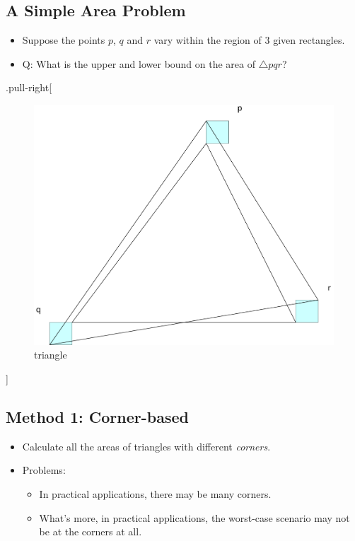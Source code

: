 \documentclass[
]{article}
\providecommand{\tightlist}{%
  \setlength{\itemsep}{0pt}\setlength{\parskip}{0pt}}
\begin{document}
\hypertarget{a-simple-area-problem}{%
\subsection{A Simple Area Problem}\label{a-simple-area-problem}}

\begin{itemize}
\tightlist
\item
  Suppose the points \(p\), \(q\) and \(r\) vary within the region of 3 given rectangles.
\item
  Q: What is the upper and lower bound on the area of \(\triangle pqr\)?
\end{itemize}

.pull-right{[}

\begin{figure}
\centering
\includegraphics{lec04.files/triangle.svg}
\caption{triangle}
\end{figure}

{]}

\hypertarget{method-1-corner-based}{%
\subsection{Method 1: Corner-based}\label{method-1-corner-based}}

\begin{itemize}
\tightlist
\item
  Calculate all the areas of triangles with different \emph{corners}.
\item
  Problems:

  \begin{itemize}
  \tightlist
  \item
    In practical applications, there may be many corners.
  \item
    What's more, in practical applications, the worst-case scenario may not be at the corners at all.
  \end{itemize}
\end{itemize}
\end{document}

